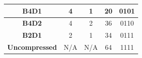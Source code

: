 \begin{table}[]
\begin{tabular}{|c|c|c|c|c|}
\textbf{B4D1}         & 4                                                            & 1                                                             & 20                                                                  & 0101                                                                    \\ \hline
\textbf{B4D2}         & 4                                                            & 2                                                             & 36                                                                  & 0110                                                                    \\ \hline
\textbf{B2D1}         & 2                                                            & 1                                                             & 34                                                                  & 0111                                                                    \\ \hline
\textbf{Uncompressed} & N/A                                                          & N/A                                                           & 64                                                                  & 1111                                                                    \\ \hline
\end{tabular}
\end{table}

